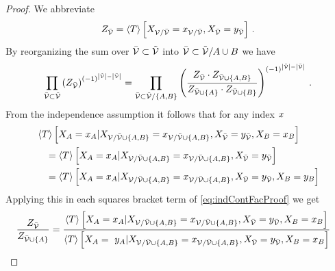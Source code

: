\begin{proof}
	We abbreviate
		\[ Z_{\bar{\mathcal{V}}} = \left\langle T\right\rangle \left[ X_{\mathcal{V}/\bar{\mathcal{V}}}=x_{\mathcal{V}/\bar{\mathcal{V}}}, X_{\bar{\mathcal{V}}} = y_{\bar{\mathcal{V}}} \right] \, .
 \]
	By reorganizing the sum over $\bar{\mathcal{V}}\subset\tilde{\mathcal{V}}$ into  $\bar{\mathcal{V}}\subset\tilde{\mathcal{V}}/A\cup B$ we have
	\begin{align}\label{eq:indContFacProof}
	 	\prod_{\bar{\mathcal{V}}\subset\tilde{\mathcal{V}}}
		\left(
			Z_{\bar{\mathcal{V}}}
		\right)^{(-1)^{\left|\tilde{\mathcal{V}}\right|-\left|\bar{\mathcal{V}}\right|}} =
		 \prod_{\bar{\mathcal{V}}\subset\tilde{\mathcal{V}}/\{A,B\}}
		 \left(
		 	\frac{
				Z_{\bar{\mathcal{V}}} \cdot Z_{\bar{\mathcal{V}}\cup\{A,B\}}
			}{
				Z_{\bar{\mathcal{V}}\cup\{A\}} \cdot Z_{\bar{\mathcal{V}}\cup\{B\}}
			}
		 \right)^{(-1)^{\left|\tilde{\mathcal{V}}\right|-\left|\bar{\mathcal{V}}\right|}} \, .
	\end{align}
	From the independence assumption it follows that for any index $x$
	\begin{align*}
		& \left\langle T\right\rangle \left[ 
			 	X_{A}=x_{A}
			  | X_{\mathcal{V}/\bar{\mathcal{V}}\cup\{A,B\}}=x_{\mathcal{V}/\bar{\mathcal{V}}\cup\{A,B\}},X_{\bar{\mathcal{V}}}=y_{\bar{\mathcal{V}}},  X_{B}=x_{B}  \right]
			 \\
		& \quad =
		\left\langle T\right\rangle \left[ 
			 	X_{A}=x_{A}
			  | X_{\mathcal{V}/\bar{\mathcal{V}}\cup\{A,B\}}=x_{\mathcal{V}/\bar{\mathcal{V}}\cup\{A,B\}}, X_{\bar{\mathcal{V}}}=y_{\bar{\mathcal{V}}} \right] \\
		 & \quad  =
		\left\langle T\right\rangle \left[ 
			 	X_{A}=x_{A}
			  | X_{\mathcal{V}/\bar{\mathcal{V}}\cup\{A,B\}}=x_{\mathcal{V}/\bar{\mathcal{V}}\cup\{A,B\}},X_{\bar{\mathcal{V}}}=y_{\bar{\mathcal{V}}},  X_{B} = y_{B} \right]
	\end{align*}
	Applying this in each squares bracket term of \eqref{eq:indContFacProof} we get
	\begin{align*}
		\frac{
			Z_{\thirdnodes}
		}{
			Z_{\thirdnodes\cup\{\nodesa\}}
		}
		& =
		\frac{
			 \sbnormationofwrt{\hypercore}{
			 	\indexedcatvariableof{\nodesa}
			 }{\indexedcatvariableof{\nodes/\thirdnodes\cup\{\nodesa,\nodesb\}}, \catvariableof{\thirdnodes}=\seccatindexof{\thirdnodes}, \indexedcatvariableof{\nodesb} }
		}{
			 \sbnormationofwrt{\hypercore}{
			 	\catvariableof{\nodesa} = \seccatindexof{\nodesa}
			 }{\indexedcatvariableof{\nodes/\thirdnodes\cup\{\nodesa,\nodesb\}} , \catvariableof{\thirdnodes}=\seccatindexof{\thirdnodes}, \indexedcatvariableof{\nodesb}}
}
\end{align*}
\end{proof}
